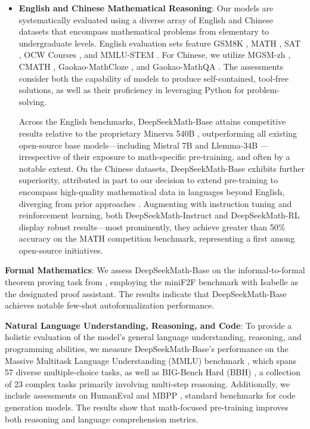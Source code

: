 \begin{itemize}[topsep=0pt]
    \item \textbf{English and Chinese Mathematical Reasoning}: Our models are systematically evaluated using a diverse array of English and Chinese datasets that encompass mathematical problems from elementary to undergraduate levels. English evaluation sets feature GSM8K \citep{gsm8k}, MATH \citep{MATH}, SAT \citep{llemma}, OCW Courses \citep{minerva}, and MMLU-STEM \citep{mmlu}. For Chinese, we utilize MGSM-zh \citep{mgsm}, CMATH \citep{wei2023cmath}, Gaokao-MathCloze \citep{agieval}, and Gaokao-MathQA \citep{agieval}. The assessments consider both the capability of models to produce self-contained, tool-free solutions, as well as their proficiency in leveraging Python for problem-solving.

    Across the English benchmarks, DeepSeekMath-Base attains competitive results relative to the proprietary Minerva 540B \citep{minerva}, outperforming all existing open-source base models—including Mistral 7B \citep{mistral} and Llemma-34B \citep{llemma}—irrespective of their exposure to math-specific pre-training, and often by a notable extent. On the Chinese datasets, DeepSeekMath-Base exhibits further superiority, attributed in part to our decision to extend pre-training to encompass high-quality mathematical data in languages beyond English, diverging from prior approaches \citep{minerva,llemma}. Augmenting with instruction tuning and reinforcement learning, both DeepSeekMath-Instruct and DeepSeekMath-RL display robust results—most prominently, they achieve greater than 50\% accuracy on the MATH competition benchmark, representing a first among open-source initiatives.
\end{itemize}

\item \textbf{Formal Mathematics}: We assess DeepSeekMath-Base on the informal-to-formal theorem proving task from \citep{dsp_proof}, employing the miniF2F benchmark \citep{minif2f} with Isabelle \citep{isabelle} as the designated proof assistant. The results indicate that DeepSeekMath-Base achieves notable few-shot autoformalization performance.
\item \textbf{Natural Language Understanding, Reasoning, and Code}: To provide a holistic evaluation of the model’s general language understanding, reasoning, and programming abilities, we measure DeepSeekMath-Base’s performance on the Massive Multitask Language Understanding (MMLU) benchmark \citep{mmlu}, which spans 57 diverse multiple-choice tasks, as well as BIG-Bench Hard (BBH) \citep{bbh}, a collection of 23 complex tasks primarily involving multi-step reasoning. Additionally, we include assessments on HumanEval \citep{codex} and MBPP \citep{mbpp}, standard benchmarks for code generation models. The results show that math-focused pre-training improves both reasoning and language comprehension metrics.

